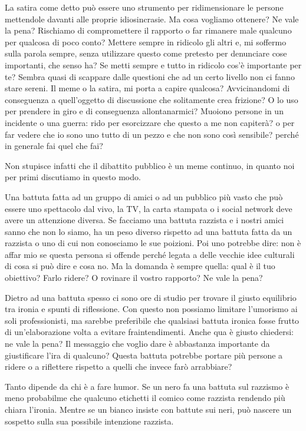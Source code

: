 \documentclass[12pt]{book} %
\begin{document}
\begin{mdframed}[linewidth=1pt]
La satira come detto può essere uno strumento per ridimensionare le persone mettendole davanti alle proprie idiosincrasie. Ma cosa vogliamo ottenere? Ne vale la pena? Rischiamo di compromettere il rapporto o far rimanere male qualcuno per qualcosa di poco conto? Mettere sempre in ridicolo gli altri e, mi soffermo sulla parola sempre, senza utilizzare questo come pretesto per denunciare cose importanti, che senso ha? Se metti sempre e tutto in ridicolo cos'è importante per te? Sembra quasi di scappare dalle questioni che ad un certo livello non ci fanno stare sereni.
Il meme o la satira, mi porta a capire qualcosa? Avvicinandomi di conseguenza a quell'oggetto di discussione che solitamente crea frizione? O lo uso per prendere in giro e di conseguenza allontanarmici? Muoiono persone in un incidente o una guerra: rido per esorcizzare che questo a me non capiterà? o per far vedere che io sono uno tutto di un pezzo e che non sono così sensibile? perché in generale fai quel che fai?

Non stupisce infatti che il dibattito pubblico è un meme continuo, in quanto noi per primi discutiamo in questo modo.

Una battuta fatta ad un gruppo di amici o ad un pubblico più vasto che può essere uno spettacolo dal vivo, la TV, la
carta stampata o i social network deve avere un attenzione diversa. Se facciamo una battuta razzista e i nostri amici sanno che non lo siamo, ha un peso diverso
rispetto ad una battuta fatta da un razzista o uno di cui non conosciamo le sue poizioni. Poi uno potrebbe dire: non è affar mio se questa persona si
offende perché legata a delle vecchie idee culturali di cosa si può dire e cosa no. Ma la domanda è sempre quella: qual è il tuo obiettivo? Farlo ridere? O rovinare il vostro rapporto? Ne vale la pena?

Dietro ad una battuta spesso ci sono ore di studio per trovare il giusto equilibrio tra ironia e spunti di riflessione. Con questo non possiamo limitare l'umorismo ai soli professionisti, ma sarebbe preferibile che qualsiasi battuta ironica fosse frutto di un'elaborazione volta a evitare fraintendimenti. Anche qua è giusto chiedersi: ne vale la pena? Il messaggio che voglio dare è abbastanza importante da giustificare l'ira di qualcuno? Questa battuta potrebbe portare più persone a ridere o a riflettere rispetto a quelli che invece farò arrabbiare?

Tanto dipende da chi è a fare humor. Se un nero fa una battuta sul razzismo è meno probabilme che qualcuno etichetti il comico come razzista rendendo più chiara l'ironia. Mentre se un bianco insiste con battute sui neri, può nascere un sospetto sulla sua possibile intenzione razzista.


\end{mdframed}
\end{document}
